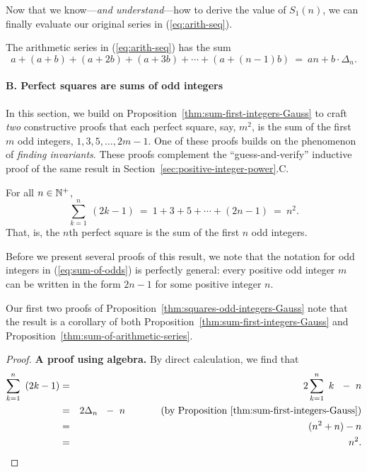 \medskip

Now that we know---{\em and understand}---how to derive the value of
$S_1(n)$, we can finally evaluate our original series in
(\ref{eq:arith-seq}).  

\begin{prop}
\label{thm:sum-of-arithmetic-series}
The arithmetic series in (\ref{eq:arith-seq}) has the sum
\[
a + (a+b) + (a+2b) + (a+3b) + \cdots + (a+(n-1)b) \ = \
an + b \cdot \Delta_n. 
\]
\end{prop}


\paragraph{\sf B. Perfect squares are sums of odd integers}
In this section, we build on
Proposition~\ref{thm:sum-first-integers-Gauss} to craft {\em two}
constructive proofs that each perfect square, say, $m^2$, is the sum
of the first $m$ odd integers, $1, 3, 5, \ldots, 2m-1$.  One of these
proofs builds on the phenomenon of {\em finding invariants}.  These
proofs complement the ``guess-and-verify'' inductive proof of the same
result in Section~\ref{sec:positive-integer-power}.C.


\begin{prop}
\label{thm:squares-odd-integers-Gauss}
For all $n \in \mathbb{N}^+$,
\begin{equation}
\label{eq:sum-of-odds}
\sum_{k=1}^n \ (2k-1)
 \ = \ 1 + 3 + 5 + \cdots + (2n-1) \ = \ n^2.
\end{equation}
That, is, the $n$th perfect square is the sum of the first $n$ odd
integers.
\end{prop}

Before we present several proofs of this result, we note that the
notation for odd integers in (\ref{eq:sum-of-odds}) is perfectly
general: every positive odd integer $m$ can be written in the form
$2n-1$ for some positive integer $n$. 

\medskip

Our first two proofs of
Proposition~\ref{thm:squares-odd-integers-Gauss} note that the result
is a corollary of both Proposition~\ref{thm:sum-first-integers-Gauss}
and Proposition~\ref{thm:sum-of-arithmetic-series}.

\medskip

\begin{proof}
{\bf A proof using algebra.}
%
By direct calculation, we find that
\begin{eqnarray*}
\sum_{k=1}^n \ \left( 2k-1 \right)
   & = & 2 \sum_{k=1}^n \ k \ \ - \ n \\
   & = & 2 \Delta_n \ \ - \ n \ \ \ \ \ \ \ \ \ \ \mbox{ (by
  Proposition~\ref{thm:sum-first-integers-Gauss})} \\
   & = & (n^2 + n) - n \\
   & = & n^2.
\end{eqnarray*}
\end{proof}

